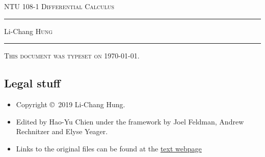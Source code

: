 \documentclass[12pt,letterpaper]{book}
\begin{document}
\setcounter{page}{0}

\begin{titlepage}
\begin{center}
\textsc{\LARGE NTU 108-1 Differential Calculus 
}\\[2ex]

\vspace{5ex}
\hrule
\vspace{5ex}

\large Li-Chang \textsc{Hung}
\end{center}
\vspace{2ex}
\hrule

\vfill
\textsc{This document was typeset on \today.}
\end{titlepage}

\subsection*{Legal stuff}
\begin{itemize}
\item Copyright \copyright\ 2019 Li-Chang Hung.

\item Edited by Hao-Yu Chien under the framework by Joel Feldman, Andrew Rechnitzer and Elyse Yeager. 

\item Links to the original files can be found at the \href{http://www.math.ubc.ca/~CLP/index.html}{text webpage}
\end{itemize}

\frontmatter


\tableofcontents

\mainmatter

\setcounter{chapter}{0}





%
\end{document}
